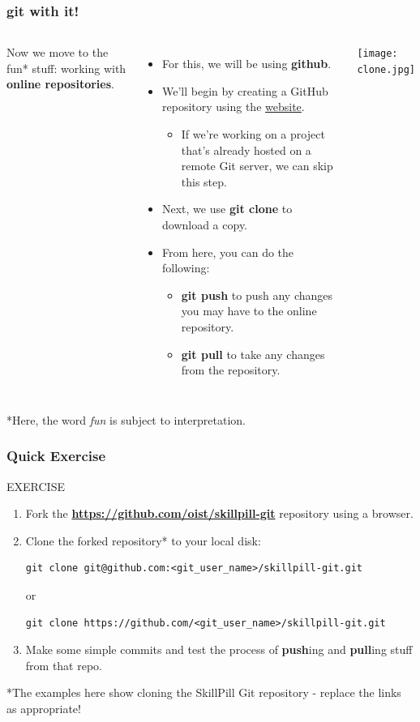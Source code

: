 \documentclass{beamer}
\begin{document}
\begin{frame}
\frametitle{\textbf{git} with it!}
\begin{columns}
Now we move to the fun* stuff: working with \textbf{online repositories}.
\begin{itemize}
\item For this, we will be using \textbf{github}.
\item We'll begin by creating a GitHub repository using the \href{www.github.com}{website}.
\begin{itemize}
\item If we're working on a project that's already hosted on a remote Git server, we can skip this step.
\end{itemize}
\item Next, we use \textbf{git clone} to download a copy.
\item From here, you can do the following:
\begin{itemize}
\item \textbf{git push} to push any changes you may have to the online repository.
\item \textbf{git pull} to take any changes from the repository.
\end{itemize}
\end{itemize}
\texttt{[image: clone.jpg]}
\end{columns}

*Here, the word \textit{fun} is subject to interpretation.
\end{frame}

\begin{frame}[fragile]
\frametitle{Quick Exercise}
    \begin{block}{EXERCISE}
        \begin{enumerate}
        \item Fork the \textbf{\href{https://github.com/oist/skillpill-git}{https://github.com/oist/skillpill-git}} repository using a browser.
        \item Clone the forked repository* to your local disk:
        \begin{lstlisting}
git clone git@github.com:<git_user_name>/skillpill-git.git
        \end{lstlisting}
        or
        \begin{lstlisting}
git clone https://github.com/<git_user_name>/skillpill-git.git
        \end{lstlisting}
        \item Make some simple commits and test the process of \textbf{push}ing and \textbf{pull}ing stuff from that repo.
        \end{enumerate}
    \end{block}

*The examples here show cloning the SkillPill Git repository - replace the links as appropriate!
\end{frame}
\end{document}
